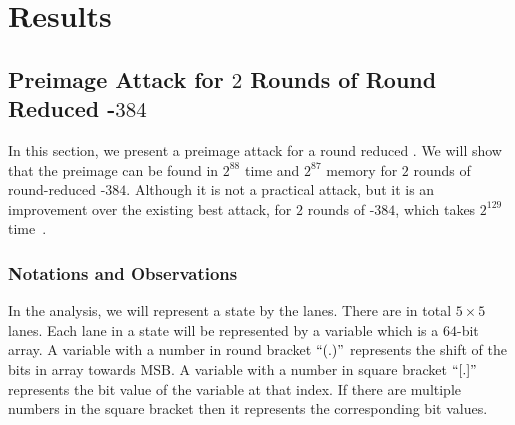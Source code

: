 \chapter{Results}

\section{Preimage Attack for $2$ Rounds of Round Reduced \KECCAK-$384$}

In this section, we present a preimage attack for a round reduced \KECCAK{}. We will show that the preimage can be found in $2^{88}$ time and $2^{87}$ memory for $2$ rounds of round-reduced \Keccak-$384$. Although it is not a practical attack, but it is an improvement over the existing best attack, for $2$ rounds of \Keccak-$384$, which takes $2^{129}$ time~\cite{guo2016linear}.


\subsection{Notations and Observations}
In the analysis, we will represent a state by the lanes. There are in total $5\times 5$ lanes. Each lane in a state will be represented by a variable which is a $64$-bit array. 
A variable with a number in round bracket $``( . )"$ represents the shift of the bits in array towards MSB. A variable with a number in square bracket $``[ . ]"$ represents the bit value of the variable at that index. If there are multiple numbers in the square bracket then it represents the corresponding bit values.


